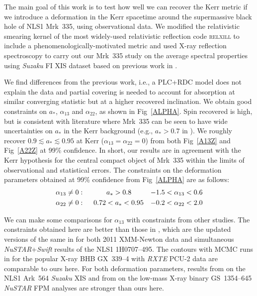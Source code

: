 \documentclass[aps,prd,twocolumn,superscriptaddress,nofootinbib,amsmath,amssymb]{revtex4-1}
\begin{document}
The main goal of this work is to test how well we can recover the Kerr metric if we introduce a deformation in the Kerr spacetime around the  supermassive black hole of NLS1 Mrk~335, using observational data. We modified the relativistic smearing kernel of the most widely-used relativistic reflection code \textsc{relxill} to include a phenomenologically-motivated metric and used X-ray reflection spectroscopy to carry out our Mrk~335 study on the average spectral properties using \textit{Suzaku} FI XIS dataset based on previous work in \cite{W13}. 

We find differences from the previous work, i.e., a PLC+RDC model does not explain the data and partial covering is needed to account for absorption at similar converging statistic but at a higher recovered inclination. We obtain good constraints on $a_*$, $\alpha_{13}$ and $\alpha_{22}$, as shown in Fig~\ref{ALPHA}. Spin recovered is high, but is consistent with literature where Mrk~335 can be seen to have wide uncertainties on $a_*$ in the Kerr background (e.g., $a_*>0.7$ in \cite{Gallo2013}). We roughly recover $0.9 \lesssim a_* \lesssim 0.95$ at Kerr ($\alpha_{13}=\alpha_{22}=0$) from both Fig~\ref{A13Z} and Fig~\ref{A22Z} at 99\% confidence. In short, our results are in agreement with the Kerr hypothesis for the central compact object of Mrk~335 within the limits of observational and statistical errors. The constraints on the deformation parameters obtained at 99\% confidence from Fig~\ref{ALPHA} are as follows:
\begin{align}
\alpha_{13} &\neq 0: \hspace{11mm} a_* > 0.8      &    -1.5 < \alpha_{13} < 0.6 \nonumber \\
\alpha_{22} &\neq 0: \hspace{4.5mm} 0.72 < a_* < 0.95    &   -0.2 < \alpha_{22} < 2.0
\end{align}

We can make some comparisons for $\alpha_{13}$ with constraints from other studies. The constraints obtained here  are better than those in \cite[Fig~2 and Fig~3]{Bambi2018}, which are the updated versions of the same in \cite{Cao2018} for both 2011 XMM-Newton data and simultaneous \textit{NuSTAR}+\textit{Swift} results of the NLS1 1H0707--495. The contours with MCMC runs in \cite{Jingyi2018} for the popular X-ray BHB GX~339--4 with \textit{RXTE} PCU-2 data are comparable to ours here. For both deformation parameters, results from \cite{TripathiArk564} on the NLS1 Ark~564 \textit{Suzaku} XIS and from \cite{Xu2018tbp} on the low-mass X-ray binary GS~1354--645 \textit{NuSTAR} FPM analyses are stronger than ours here.\\
\end{document}
